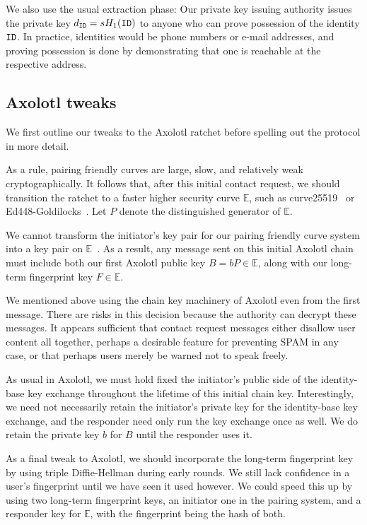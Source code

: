 \documentclass[twoside,letterpaper]{sig-alternate}
\begin{document}
We also use the usual extraction phase:
Our private key issuing authority
issues the private key $d_{\mathtt{ID}} = s H_1(\mathtt{ID})$ to anyone who
can prove possession of the identity $\mathtt{ID}$.  In practice,
identities would be phone numbers or e-mail addresses,
and proving possession is done by demonstrating that
one is reachable at the respective address.

\subsection{Axolotl tweaks} %

We first outline our tweaks to the Axolotl ratchet before
 spelling out the protocol in more detail.

As a rule, pairing friendly curves are large, slow, and relatively
 weak cryptographically.
It follows that, after this initial contact request, we should
transition the ratchet to a faster higher security curve $\mathbb{E}$,
such as curve25519~\cite{DJB-Curve25519}
 or Ed448-Goldilocks~\cite{Ed448-Goldilocks}.
Let $P$ denote the distinguished generator of $\mathbb{E}$.

We cannot transform the initiator's key pair for
our pairing friendly curve system
into a key pair on $\mathbb{E}$~\cite{??no_homomorphism??}.
As a result, any message sent on this initial Axolotl chain must include
both our first Axolotl public key $B = b P \in \mathbb{E}$,
 along with our long-term fingerprint key $F \in \mathbb{E}$.

We mentioned above using the chain key machinery of Axolotl even from
the first message.  There are risks in this decision because the
authority can decrypt these messages.  It appears sufficient that
contact request messages either disallow user content all together,
perhaps a desirable feature for preventing SPAM in any case, or that
perhaps users merely be warned not to speak freely.

As usual in Axolotl, we must hold fixed the initiator's public side of
the identity-base key exchange throughout the lifetime of this initial
chain key.  Interestingly, we need not necessarily retain the
initiator's private key for the identity-base key exchange, and
 the responder need only run the key exchange once as well.
We do retain the private key $b$ for $B$ until the responder uses it.

As a final tweak to Axolotl, we should incorporate the long-term
fingerprint key by using triple Diffie-Hellman during early rounds.
We still lack confidence in a user's fingerprint until
we have seen it used however.
We could speed this up by using two long-term fingerprint keys,
an initiator one in the pairing system, and
 a responder key for $\mathbb{E}$,
with the fingerprint being the hash of both.
\end{document}
